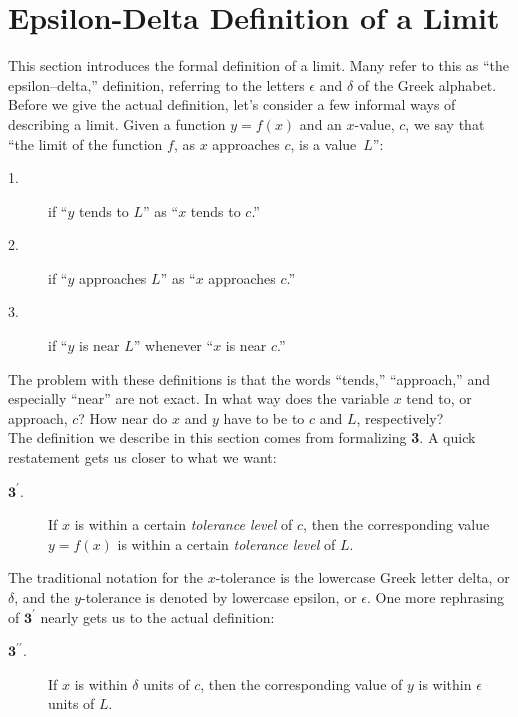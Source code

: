 
\section{Epsilon-Delta Definition of a Limit}\label{sec:limit_def}

This section introduces the formal definition of a limit. Many refer to this as ``the epsilon--delta,'' definition, referring to the letters $\epsilon$ and $\delta$ of the Greek alphabet.\\

Before we give the actual definition, let's consider a few informal ways of describing a limit.  Given a function $y=f(x)$ and an $x$-value, $c$, we say that ``the limit of the function $f$, as $x$ approaches $c$, is a value~$L$'': 

\begin{description}
\item[1.]if ``$y$ tends to $L$'' as ``$x$ tends to $c$.''
\item[2.]if ``$y$ approaches $L$'' as ``$x$ approaches $c$.''
\item[3.]if ``$y$ is near $L$'' whenever ``$x$ is near $c$.''
\end{description}

The problem with these definitions is that the words ``tends,'' ``approach,'' and especially ``near'' are not exact.  In what way does the variable $x$ tend to, or approach, $c$? How near do $x$ and $y$ have to be to $c$ and $L$, respectively?  \\

The definition we describe in this section comes from formalizing {\bf 3}.  A quick restatement gets us closer to what we want:

\begin{description}
\item[$\textbf{3}^\prime$.]If $x$ is within a certain \textit{tolerance level} of $c$, then the corresponding value $y=f(x)$ is within a certain \textit{tolerance level} of $L$.
\end{description}

The traditional notation for the $x$-tolerance is the lowercase Greek letter delta, or $\delta$, and the $y$-tolerance is denoted by lowercase epsilon, or $\epsilon$. One more rephrasing of $\textbf{3}^\prime$ nearly gets us to the actual definition:

\begin{description}
\item[$\textbf{3}^{\prime \prime}$.]If $x$ is within $\delta$ units of $c$, then the corresponding value of $y$ is within $\epsilon$ units of $L$.
\end{description}

